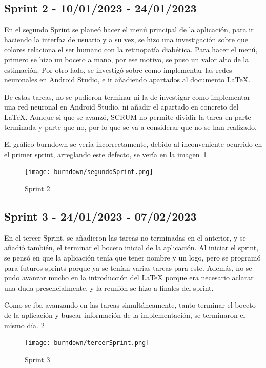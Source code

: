 \subsection{Sprint 2 - 10/01/2023 - 24/01/2023}
En el segundo Sprint se planeó hacer el menú principal de la aplicación, para ir haciendo la interfaz de usuario y a su vez, se hizo una investigación sobre que colores relaciona el ser humano con la retinopatía diabética.
Para hacer el menú, primero se hizo un boceto a mano, por ese motivo, se puso un valor alto de la estimación.
Por otro lado, se investigó sobre como implementar las redes neuronales en Android Studio, e ir añadiendo apartados al documento LaTeX.

De estas tareas, no se pudieron terminar ni la de investigar como implementar una red neuronal en Android Studio, ni añadir el apartado en concreto del LaTeX. Aunque si que se avanzó, SCRUM no permite dividir la tarea en parte terminada y parte que no, por lo que se va a considerar que no se han realizado.

El gráfico burndown se vería incorrectamente, debido al inconveniente ocurrido en el primer sprint, arreglando este defecto, se vería en la imagen~\ref{fig:Sprint2}.

\begin{figure}[!ht]
         \centering
         \texttt{[image: burndown/segundoSprint.png]}
         \caption{Sprint 2}
         \label{fig:Sprint2}
\end{figure}

\subsection{Sprint 3 - 24/01/2023 - 07/02/2023}
En el tercer Sprint, se añadieron las tareas no terminadas en el anterior, y se añadió también, el terminar el boceto inicial de la aplicación.
Al iniciar el sprint, se pensó en que la aplicación tenía que tener nombre y un logo, pero se programó para futuros sprints porque ya se tenían varias tareas para este.
Además, no se pudo avanzar mucho en la introducción del LaTeX porque era necesario aclarar una duda presencialmente, y la reunión se hizo a finales del sprint.

Como se iba avanzando en las tareas simultáneamente, tanto terminar el boceto de la aplicación y buscar información de la implementación, se terminaron el mismo día. \ref{fig:Sprint3}

\begin{figure}[!ht]
         \centering
         \texttt{[image: burndown/tercerSprint.png]}
         \caption{Sprint 3}
         \label{fig:Sprint3}
\end{figure}
